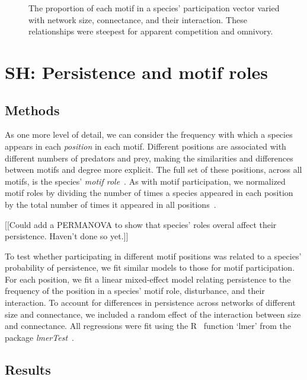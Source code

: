 \documentclass[12pt]{article}
\begin{document}
\begin{spacing}{2.0}
\begin{figure}[h!]
        \caption{The proportion of each motif in a species' participation vector varied with network size, connectance, and their interaction. These relationships were steepest for apparent competition and omnivory.}
        \label{fig:roles_vs_SC}
    \end{figure}
\clearpage 

\section{SH: Persistence and motif roles}

    \subsection*{Methods}

        As one more level of detail, we can consider the frequency with which a species appears in each \emph{position} in each motif. 
        Different positions are associated with different numbers of predators and prey, making the similarities and differences between motifs and degree more explicit.
        The full set of these positions, across all motifs, is the species' \emph{motif role}~\citep{Stouffer2010,Cirtwill2017}.
        As with motif participation, we normalized motif roles by dividing the number of times a species appeared in each position by the total number of times it appeared in all positions~\citep{Baker2015,Cirtwill2017}.
        
        
        [[Could add a PERMANOVA to show that species' roles overal affect their persistence. Haven't done so yet.]]
        

        To test whether participating in different motif positions was related to a species' probability of persistence, we fit similar models to those for motif participation.
        For each position, we fit a linear mixed-effect model relating persistence to the frequency of the position in a species' motif role, disturbance, and their interaction.
        To account for differences in persistence across networks of different size and connectance, we included a random effect of the interaction between size and connectance.
        All regressions were fit using the R~\citep{R} function `lmer' from the package \emph{lmerTest}~\citep{lmerTest}.

    
    \subsection*{Results}


\end{spacing}
\end{document}
